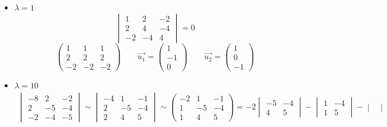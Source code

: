 \begin{itemize}
	\item $ \lambda = 1 $
    $$
    \begin{vmatrix}
    	1 & 2 & -2 \\
        2 & 4 & -4 \\
        -2 & -4 & 4
    \end{vmatrix} = 0 $$
    $$
    \begin{pmatrix}
    	1 & 1 & 1 \\
        2 & 2 & 2 \\
        -2 & -2 & -2
    \end{pmatrix} \qquad \vec{u_1} =
    \begin{pmatrix}
    	1 \\
        -1 \\
        0
    \end{pmatrix} \qquad \vec{u_2} =
    \begin{pmatrix}
    	1 \\
        0 \\
        -1
    \end{pmatrix} $$
    \item $ \lambda = 10 $
    \begin{multline*}
        \begin{vmatrix}
            -8 & 2 & -2 \\
            2 & -5 & -4 \\
            -2 & -4 & -5
        \end{vmatrix} \sim
        \begin{vmatrix}
            -4 & 1 & -1 \\
            2 & -5 & -4 \\
            2 & 4 & 5
        \end{vmatrix} \sim
        \begin{pmatrix}
            -2 & 1 & -1 \\
            1 & -5 & -4 \\
            1 & 4 & 5
        \end{pmatrix} = -2
        \begin{vmatrix}
            -5 & -4 \\
            4 & 5
        \end{vmatrix} -
        \begin{vmatrix}
            1 & -4 \\
            1 & 5
        \end{vmatrix} -
        \begin{vmatrix}

\end{vmatrix}
\end{multline*}
\end{itemize}
